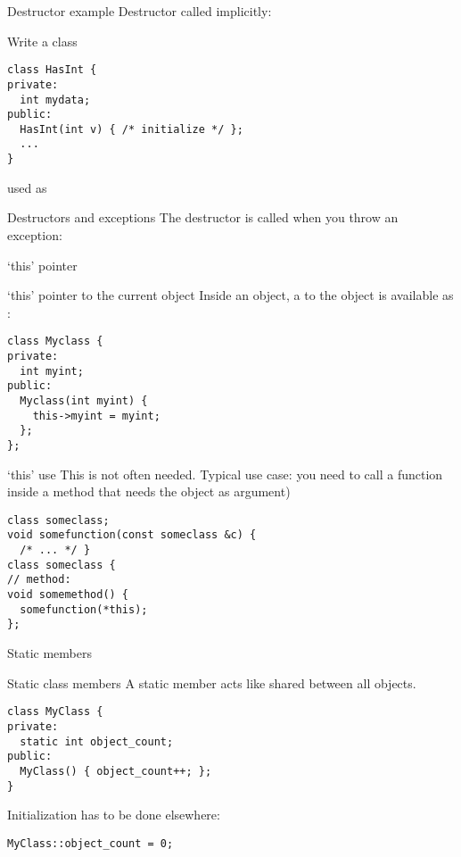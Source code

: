 \begin{slide}{Destructor example}
  \label{sl:class-destruct-ex2}
  Destructor called implicitly:
\end{slide}

\begin{exercise}
  \label{ex:destruct-trace}
  Write a class
\begin{lstlisting}
class HasInt {
private:
  int mydata;
public:
  HasInt(int v) { /* initialize */ };
  ...
}
\end{lstlisting}
used as
%
\end{exercise}

\begin{block}{Destructors and exceptions}
  \label{sl:exceptobj}
  The destructor is called when you throw an exception:
\end{block}

 {`this' pointer}

\begin{block}{`this' pointer to the current object}
  \label{sl:class-this}
  Inside an object, a  to the object is available
  as :
\begin{lstlisting}
class Myclass {
private:
  int myint;
public:
  Myclass(int myint) {
    this->myint = myint;
  };
};
\end{lstlisting}
\end{block}
\begin{block}{`this' use}
  \label{sl:class-this-fun}
This is not often needed. Typical use case:
you need to call a function inside a method that needs the object as argument)
\begin{lstlisting}
class someclass;
void somefunction(const someclass &c) {
  /* ... */ }
class someclass {
// method:
void somemethod() {
  somefunction(*this);
};
\end{lstlisting}
\end{block}

 {Static members}

\begin{block}{Static class members}
  \label{sl:static-member}
  A static member acts like shared between all objects.
\begin{lstlisting}
class MyClass {
private:
  static int object_count;
public:
  MyClass() { object_count++; };
}
\end{lstlisting}
Initialization has to be done elsewhere:
\begin{lstlisting}
MyClass::object_count = 0;
\end{lstlisting}
\end{block}

